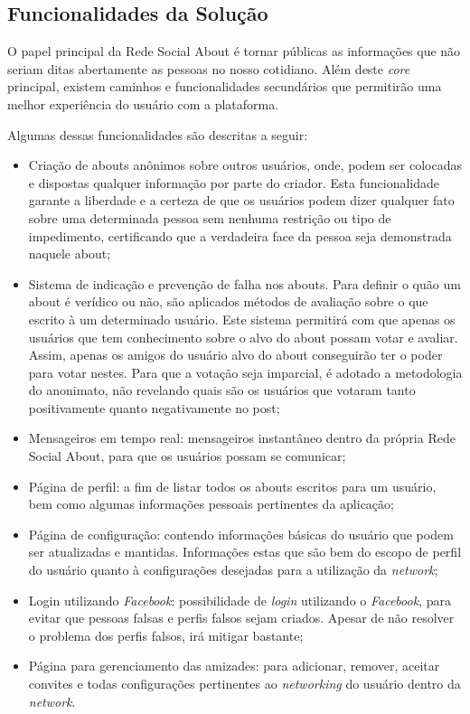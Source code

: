 \subsection{Funcionalidades da Solução}
\label{sub:propostadesolucao}
O papel principal da Rede Social About é tornar públicas as informações que não seriam ditas abertamente as pessoas
no nosso cotidiano. 
Além deste \textit{core} principal, existem caminhos e funcionalidades
secundários  que permitirão uma melhor experiência do usuário com a plataforma.

Algumas dessas funcionalidades são descritas a seguir:

\begin{itemize}
    \item Criação de abouts anônimos sobre outros usuários, onde, podem ser colocadas e dispostas
        qualquer informação por parte do criador. Esta funcionalidade garante a liberdade
        e a certeza de que os usuários podem dizer qualquer fato sobre uma determinada pessoa
        sem nenhuma restrição ou tipo de impedimento, certificando que a verdadeira
        face da pessoa seja demonstrada naquele about;
    \item Sistema de indicação e prevenção de falha nos abouts. Para definir o quão um about é
        verídico ou não, são aplicados métodos de avaliação sobre o que escrito
        à um determinado usuário. Este sistema permitirá com que apenas os usuários que tem
        conhecimento sobre o alvo do about possam votar e avaliar. Assim, apenas
        os amigos do usuário alvo do about conseguirão ter o poder para votar nestes.
        Para que a votação seja imparcial, é adotado a metodologia do anonimato,
        não revelando quais são os usuários que votaram tanto positivamente quanto negativamente
        no post;
    \item Mensageiros em tempo real: mensageiros instantâneo dentro da própria Rede Social About, para que os usuários possam se
        comunicar;
    \item Página de perfil: a fim de listar todos os abouts escritos para um usuário, bem como algumas informações
        pessoais pertinentes da aplicação;
    \item Página de configuração: contendo informações básicas do usuário que podem ser atualizadas e mantidas.
        Informações estas que são bem do escopo de perfil do usuário quanto à configurações desejadas
        para a utilização da \textit{network};
    \item Login utilizando \textit{Facebook}: possibilidade de \textit{login} utilizando o \textit{Facebook}, para evitar que pessoas
        falsas e perfis falsos sejam criados. Apesar de não resolver o problema dos perfis falsos,
        irá mitigar bastante;
    \item Página para gerenciamento das amizades: para adicionar, remover, aceitar convites e todas configurações
        pertinentes ao \textit{networking} do usuário dentro da \textit{network}.
\end{itemize}

